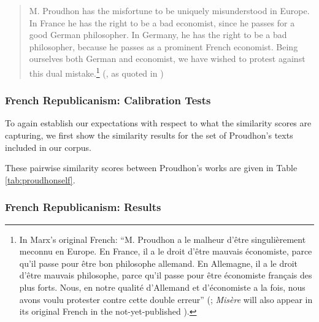\begin{quote}
M. Proudhon has the misfortune to be uniquely misunderstood in Europe. In France he has the right to be a bad economist, since he passes for a good German philosopher. In Germany, he has the right to be a bad philosopher, because he passes as a prominent French economist. Being ourselves both German and economist, we have wished to protest against this dual mistake.\footnote{In Marx's original French: ``M. Proudhon a le malheur d'être singulièrement meconnu en Europe. En France, il a le droit d'être mauvais économiste, parce qu'il passe pour être bon philosophe allemand. En Allemagne, il a le droit d'être mauvais philosophe, parce qu'il passe pour être économiste français des plus forts. Nous, en notre qualité d'Allemand et d'économiste a la fois, nous avons voulu protester contre cette double erreur'' (; \textit{Misère} will also appear in its original French in the not-yet-published ).} (, as quoted in \cite{tribe_economy_2015})
\end{quote}



\subsubsection{French Republicanism: Calibration Tests}

To again establish our expectations with respect to what the similarity scores are capturing, we first show the similarity results for the set of Proudhon's texts included in our corpus.


These pairwise similarity scores between Proudhon's works are given in Table \ref{tab:proudhonself}.





\subsubsection{French Republicanism: Results}

